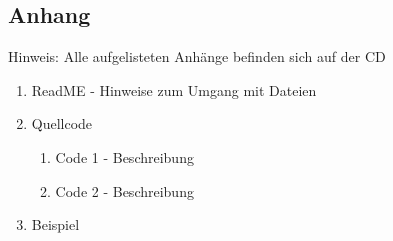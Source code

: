 \subsection*{Anhang}\label{anhang}
Hinweis: Alle aufgelisteten Anhänge befinden sich auf der CD
\begin{enumerate}
\item ReadME - Hinweise zum Umgang mit Dateien
\item Quellcode
\begin{enumerate}
\item Code 1 - Beschreibung
\item Code 2 - Beschreibung
\end{enumerate}
\item Beispiel
\end{enumerate}